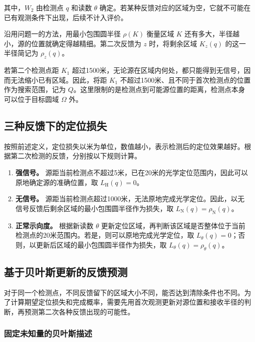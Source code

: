 \documentclass[UTF8,a4paper,zihao=-4,fontset=none]{ctexart}
\begin{document}
其中，\(W_2\) 由检测点 \(q\) 和读数 \(\theta\) 确定。若某种反馈对应的区域为空，它就不可能在已有观测条件下出现，后续不计入评价。

沿用问题一的方法，用最小包围圆半径 \(\rho(K)\) 衡量区域 \(K\) 还有多大，半径越小，源的位置就确定得越精细。第二次反馈为 \(z\) 时，将剩余区域 \(K_z(q)\) 的这一半径简记为 \(\rho_z(q)\)。

若第二个检测点距 \(K_1\) 超过1500米，无论源在区域内何处，都只能得到无信号，因而无法缩小已有区域。因此，将距 \(K_1\) 不超过1500米、且不同于首次检测点的位置作为搜索范围，记为 \(Q\)。这里限制的是检测点到可能源位置的距离，检测点本身可以位于目标圆域 \(\Omega\) 外。

\subsection{三种反馈下的定位损失}

按照前述定义，定位损失以米为单位，数值越小，表示检测后的定位效果越好。根据第二次检测的反馈，分别按以下规则计算。

\begin{enumerate}[label=(\arabic*),leftmargin=2.2em]
  \item \textbf{强信号。} 源距当前检测点不超过5米，已在20米的光学定位范围内，因此可以原地确定源的准确位置，取 \(L_{\mathrm H}(q)=0\)。
  \item \textbf{无信号。} 源距当前检测点超过1000米，无法原地完成光学定位。因此，以无信号反馈后剩余区域的最小包围圆半径作为损失，取 \(L_{\mathrm N}(q)=\rho_{\mathrm N}(q)\)。
  \item \textbf{正常示向度。} 根据新读数 \(\theta\) 更新定位区域，再判断该区域是否整体位于当前检测点的20米范围内。若是，则可以原地完成光学定位，取 \(L_\theta(q)=0\)；否则，以更新后区域的最小包围圆半径作为损失，取 \(L_\theta(q)=\rho_\theta(q)\)。
\end{enumerate}

\subsection{基于贝叶斯更新的反馈预测}

对于同一个检测点，不同反馈留下的区域大小不同，能否达到清除条件也不同。为了计算期望定位损失和完成概率，需要先用首次观测更新对源位置和接收半径的判断，再预测第二次各种反馈出现的可能性。

\subsubsection{固定未知量的贝叶斯描述}
\end{document}
